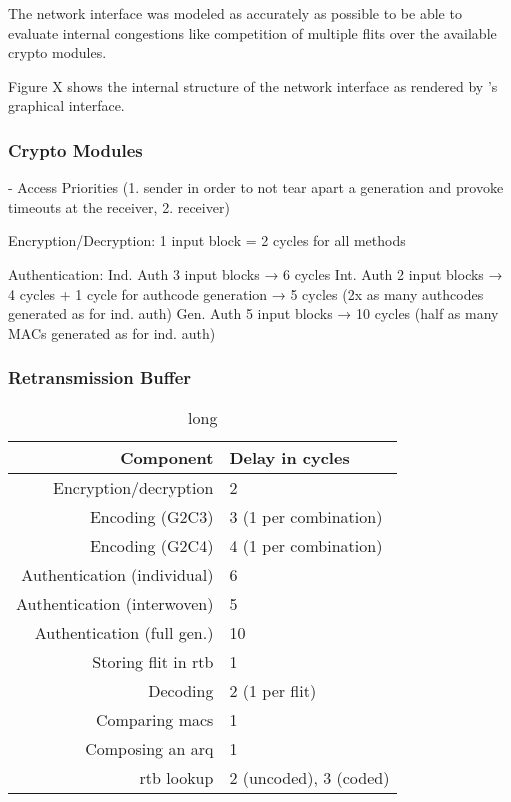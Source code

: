 The network interface was modeled as accurately as possible to be able to evaluate internal congestions like competition of multiple flits over the
available crypto modules.

Figure X shows the internal structure of the network interface as rendered by \omnet{}'s graphical interface.

\subsubsection{Crypto Modules}
- Access Priorities (1. sender in order to not tear apart a generation and provoke timeouts at the receiver, 2. receiver)

Encryption/Decryption:
1 input block = 2 cycles for all methods

Authentication:
Ind. Auth 3 input blocks → 6 cycles
Int. Auth 2 input blocks → 4 cycles + 1 cycle for authcode generation → 5 cycles (2x as many authcodes generated as for ind. auth)
Gen. Auth 5 input blocks → 10 cycles (half as many MACs generated as for ind. auth)

\subsubsection{Retransmission Buffer}

\begin{table}
    \centering
    \begin{tabulary}{\textwidth}{R|L}
        Component & Delay in cycles \\\hline
        Encryption/decryption & 2 \\
        Encoding (G2C3) & 3 (1 per combination) \\
        Encoding (G2C4) & 4 (1 per combination) \\
        Authentication (individual) & 6 \\
        Authentication (interwoven) & 5 \\
        Authentication (full gen.) & 10 \\
        Storing flit in \gls{rtb} & 1 \\
        Decoding & 2 (1 per flit) \\
        Comparing \glspl{mac} & 1 \\
        Composing an \gls{arq} & 1 \\
        \Gls{rtb} lookup & 2 (uncoded), 3 (coded)
    \end{tabulary}
    \caption[short]{long}
    \label{tab:processinglatencies}
\end{table}

